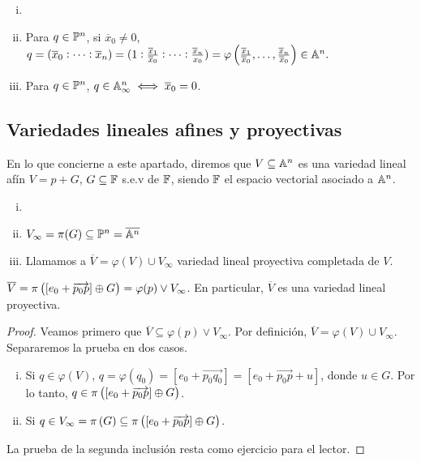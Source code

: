\begin{obs}
  \begin{enumerate}[i)]
    \item[]
    \item Para $q \in \mathbb{P}^n$, si $\overline{x}_0 \neq 0$, $q = (\overline{x}_0:
      \dots:\overline{x}_n) = (1:\frac{\overline{x}_1}{\overline{x}_0}:
      \dots:\frac{\overline{x}_n}{x_0}) = \varphi \left( \frac{\overline{x}_1}{\overline{x}_0}
      ,\dots,\frac{\overline{x}_n}{\overline{x}_0} \right) \in \mathbb{A}^n.$
    \item Para $q \in \mathbb{P}^n$, $q \in \mathbb{A}^n_\infty \iff \overline{x}_0 = 0$.
  \end{enumerate}
\end{obs}

\subsection{Variedades lineales afines y proyectivas}

En lo que concierne a este apartado, diremos que $V \subseteq \mathbb{A}^n$ es una variedad 
lineal afín $V = p+G$, $G \subseteq \mathbb{F}$ s.e.v de $\mathbb{F}$, siendo $\mathbb{F}$ el espacio vectorial
asociado a $\mathbb{A}^n$.

\begin{defi}
  \begin{enumerate}[i)]
    \item[]
    \item $V_\infty = \pi(G) \subseteq \mathbb{P}^n = \overline{\mathbb{A}^n}$
    \item Llamamos a $\overline{V} = \varphi(V) \cup V_\infty$ variedad lineal 
      proyectiva completada de $V$.
  \end{enumerate}
\end{defi}

\begin{prop}
  $\overline{V} = \pi \left( [e_0 + \overrightarrow{p_0p}] \oplus G \right) = \varphi(p) \vee
  V_\infty$. En particular, $\overline{V}$ es una variedad lineal proyectiva. 
\end{prop}

\begin{proof}
  Veamos primero que $\overline{V} \subseteq \varphi(p) \vee V_\infty$. Por definición,
  $\overline{V} = \varphi(V) \cup V_\infty$. Separaremos la prueba en dos casos.
  \begin{enumerate}[i)]
    \item Si $q \in \varphi(V)$, $q = \varphi(q_0) = [e_0 + \overrightarrow{p_0q_0}]
        = [e_0 + \overrightarrow{p_0p}+u]$, donde $u \in G$. Por lo tanto,
        $q \in \pi \left([e_0 + \overrightarrow{p_0p}] \oplus G \right)$.
      \item Si $q \in V_\infty = \pi \left( G \right) \subseteq \pi \left( [e_0 + \overrightarrow{p_0
        p}] \oplus G \right)$.
  \end{enumerate}
  
  La prueba de la segunda inclusión resta como ejercicio para el lector.
\end{proof}

